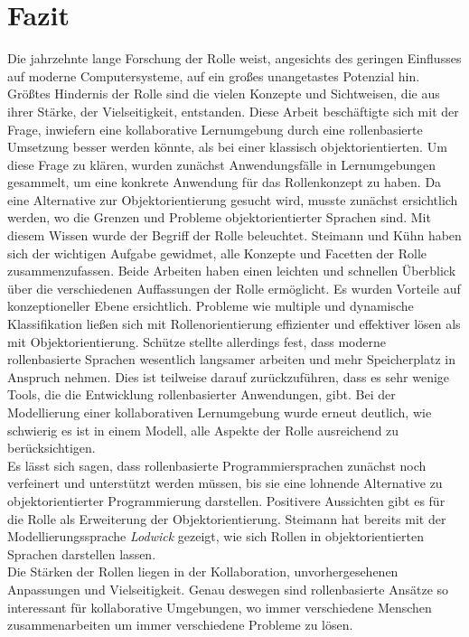 \documentclass[conference]{IEEEtran}
\begin{document}
\section{Fazit}
Die jahrzehnte lange Forschung der Rolle weist, angesichts des geringen Einflusses auf moderne Computersysteme, auf ein großes unangetastes Potenzial hin. Größtes Hindernis der Rolle sind die vielen Konzepte und Sichtweisen, die aus ihrer Stärke, der Vielseitigkeit, entstanden. 
Diese Arbeit beschäftigte sich mit der Frage, inwiefern eine kollaborative Lernumgebung durch eine rollenbasierte Umsetzung besser werden könnte, als bei einer klassisch objektorientierten. Um diese Frage zu klären, wurden zunächst Anwendungsfälle in Lernumgebungen gesammelt, um eine konkrete Anwendung für das Rollenkonzept zu haben. Da eine Alternative zur Objektorientierung gesucht wird, musste zunächst ersichtlich werden, wo die Grenzen und Probleme objektorientierter Sprachen sind. Mit diesem Wissen wurde der Begriff der Rolle beleuchtet. Steimann \cite{steimann2000representation} und Kühn \cite{family} haben sich der wichtigen Aufgabe gewidmet, alle Konzepte und Facetten der Rolle zusammenzufassen. Beide Arbeiten haben einen leichten und schnellen Überblick über die verschiedenen Auffassungen der Rolle ermöglicht. Es wurden Vorteile auf konzeptioneller Ebene ersichtlich. Probleme wie multiple und dynamische Klassifikation ließen sich mit Rollenorientierung effizienter und effektiver lösen als mit Objektorientierung. Schütze stellte allerdings fest, dass moderne rollenbasierte Sprachen wesentlich langsamer arbeiten und mehr Speicherplatz in Anspruch nehmen. Dies ist teilweise darauf zurückzuführen, dass es sehr wenige Tools, die die Entwicklung rollenbasierter Anwendungen, gibt. Bei der Modellierung einer kollaborativen Lernumgebung wurde erneut deutlich, wie schwierig es ist in einem Modell, alle Aspekte der Rolle ausreichend zu berücksichtigen. \\ Es lässt sich sagen, dass rollenbasierte Programmiersprachen zunächst noch verfeinert und unterstützt werden müssen, bis sie eine lohnende Alternative zu objektorientierter Programmierung darstellen. Positivere Aussichten gibt es für die Rolle als Erweiterung der Objektorientierung. Steimann hat bereits mit der Modellierungssprache \textit{Lodwick} gezeigt, wie sich Rollen in objektorientierten Sprachen darstellen lassen. \\ Die Stärken der Rollen liegen in der Kollaboration, unvorhergesehenen Anpassungen und Vielseitigkeit. Genau deswegen sind rollenbasierte Ansätze so interessant für kollaborative Umgebungen, wo immer verschiedene Menschen zusammenarbeiten um immer verschiedene Probleme zu lösen. 
{}



\end{document}

